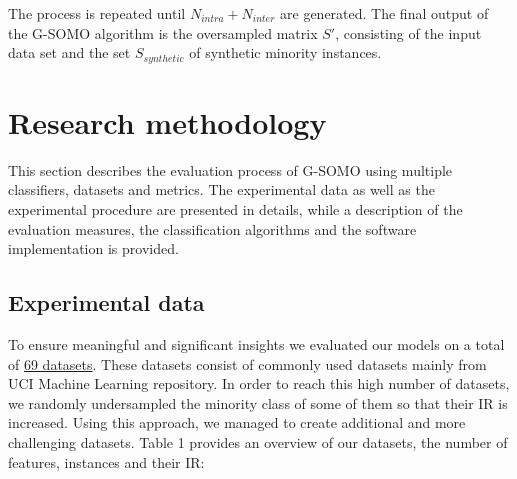 \documentclass[parskip=full]{scrartcl}
\begin{document}
The process is repeated until $N_{intra} + N_{inter}$ are generated. The final output of the G-SOMO algorithm is the oversampled matrix $S'$, consisting of the input data set and the set $S_{synthetic}$ of synthetic minority instances.

\section{Research methodology}

This section describes the evaluation process of G-SOMO using multiple classifiers, datasets and metrics. The experimental data as well as the experimental procedure are presented in details, while a description of the evaluation measures, the classification algorithms and the software implementation is provided.

\subsection{Experimental data}

To ensure meaningful and significant insights we evaluated our models on a total of \href{https://github.com/AlgoWit/publications/blob/master/gsomo/data/gsomo.db}{69 datasets}. These datasets consist of commonly used datasets mainly from UCI Machine Learning repository. In order to reach this high number of datasets, we randomly undersampled the minority class of some of them so that their IR is increased. Using this approach, we managed to create additional and more challenging datasets. Table 1 provides an overview of our datasets, the number of features, instances and their IR:

\end{document}
